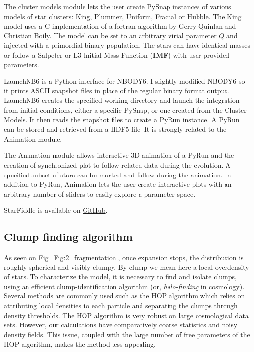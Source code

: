 The cluster models module lets the user create PySnap instances of various models of star clusters: King, Plummer, Uniform, Fractal or Hubble. The King model uses a C implementation of a fortran algorithm by Gerry Quinlan and Christian Boily. The model can be set to an arbitrary virial parameter $Q$ and injected with a primordial binary population. The stars can have identical masses or follow a Salpeter or L3 Initial Mass Function (\textbf{IMF}) with user-provided parameters.

LaunchNB6 is a Python interface for NBODY6. I slightly modified NBODY6 so it prints ASCII snapshot files in place of the regular binary format output. LaunchNB6 creates the specified working directory and launch the integration from initial conditions, either a specific PySnap, or one created from the Cluster Models. It then reads the snapshot files to create a PyRun instance. A PyRun can be stored and retrieved from a HDF5 file. It is strongly related to the Animation module.

The Animation module allows interactive 3D animation of a PyRun and the creation of synchronized plot to follow related data during the evolution. A specified subset of stars can be marked and follow during the animation. In addition to PyRun, Animation lets the user create interactive plots with an arbitrary number of sliders to easily explore a parameter space.

StarFiddle is available on \href{https://github.com/dorvaljulien/StarFiddle}{GitHub}.












\subsection{Clump finding algorithm}

As seen on Fig~\ref{Fig:2_fragmentation}, once expansion stops, the distribution is roughly spherical and visibly clumpy. By clump we mean here a local overdensity of stars. To characterize the model, it is necessary to find and isolate clumps, using an efficient clump-identification algorithm (or, {\it halo-finding} in cosmology).  Several methods are commonly used such as the HOP algorithm \citep{Eisenstein1998,Skory2010} which relies on attributing local densities to each particle and separating the clumps through density thresholds. The HOP algorithm is very robust on large cosmological data sets. However, our calculations have comparatively coarse statistics and noisy density fields. This issue, coupled with the  large number of free parameters of the HOP algorithm, makes the method less appealing. 

